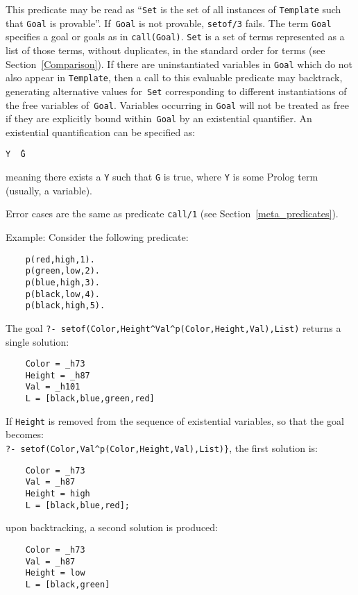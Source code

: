 \begin{description}
    This predicate may be read as ``{\tt Set} is the set of all instances 
    of {\tt Template} such that {\tt Goal} is provable''.
    If~{\tt Goal} is not provable, {\tt setof/3} fails.
    The term {\tt Goal} specifies a goal or goals as in {\tt call(Goal)}.
    {\tt Set} is a set of terms represented as a list of those terms,
    without duplicates, in the standard order for terms 
    (see Section~\ref{Comparison}).
    If there are uninstantiated variables in {\tt Goal} which do not also 
    appear in {\tt Template}, then a call to this evaluable predicate may backtrack,
    generating alternative values for~{\tt Set} corresponding to different
    instantiations of the free variables of~{\tt Goal}.
    Variables occurring in {\tt Goal} will not be treated as free if they 
    are explicitly bound within~{\tt Goal} by an existential quantifier.
    An existential quantification can be specified as:
    \begin{center}
    {\tt Y \^\ G}\index{\^}
    \end{center}
    meaning there exists a {\tt Y} such that {\tt G} is true,
    where {\tt Y} is some Prolog term (usually, a variable).
  
    Error cases are the same as predicate {\tt call/1} (see
    Section~\ref{meta_predicates}).

Example: Consider the following predicate: 
%
\begin{verbatim}
    p(red,high,1).
    p(green,low,2).
    p(blue,high,3).
    p(black,low,4).
    p(black,high,5).
\end{verbatim}
%
The goal \verb|?- setof(Color,Height^Val^p(Color,Height,Val),List)|
returns a single solution:
\begin{verbatim}
    Color = _h73
    Height = _h87
    Val = _h101
    L = [black,blue,green,red]
\end{verbatim}

If {\tt Height} is removed from the sequence of existential variables, so
that the goal becomes:\\
\verb|?- setof(Color,Val^p(Color,Height,Val),List)}|, the first solution is:
\begin{verbatim}
    Color = _h73
    Val = _h87
    Height = high
    L = [black,blue,red];
\end{verbatim}
%
upon backtracking, a second solution is produced: 
%
\begin{verbatim}
    Color = _h73
    Val = _h87
    Height = low
    L = [black,green]
\end{verbatim}


\end{description}
